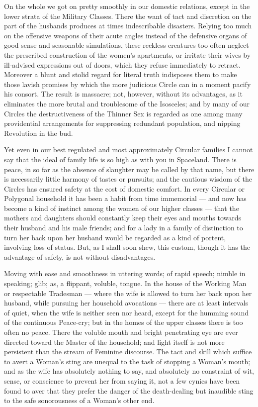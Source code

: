 \documentclass[12pt, a4paper, twoside]{memoir}
\begin{document}
On the whole we got on pretty smoothly in our domestic
relations, except in the lower strata of the Military Classes. There the want
of tact and discretion on the part of the husbands produces at times
indescribable disasters. Relying too much on the offensive weapons of their
acute angles instead of the defensive organs of good sense and seasonable
simulations, these reckless creatures too often neglect the prescribed
construction of the women's apartments, or irritate their wives by ill-advised
expressions out of doors, which they refuse immediately to retract. Moreover a
blunt and stolid regard for literal truth indisposes them to make those lavish
promises by which the more judicious Circle can in a moment pacify his
consort. The result is massacre; not, however, without its advantages, as it
eliminates the more brutal and troublesome of the Isosceles; and by many of
our Circles the destructiveness of the Thinner Sex is regarded as one among
many providential arrangements for suppressing redundant population, and
nipping Revolution in the bud.

Yet even in our best regulated and most approximately Circular families I
cannot say that the ideal of family life is so high as with you in Spaceland.
There is peace, in so far as the absence of slaughter may be called by that
name, but there is necessarily little harmony of tastes or pursuits; and the
cautious wisdom of the Circles has ensured safety at the cost of domestic
comfort. In every Circular or Polygonal household it has been a habit from
time immemorial --- and now has become a kind of instinct among the women of our
higher classes --- that the mothers and daughters should constantly keep their
eyes and mouths towards their husband and his male friends; and for a lady in
a family of distinction to turn her back upon her husband would be regarded as
a kind of portent, involving loss of status. But, as I shall soon shew, this
custom, though it has the advantage of safety, is not without disadvantages.

Moving with ease and smoothness in uttering words; of rapid speech;
nimble in speaking; glib; as, a flippant, voluble, tongue.  In the house of
the Working Man or respectable Tradesman --- where the wife is allowed to turn
her back upon her husband, while pursuing her household avocations --- there are
at least intervals of quiet, when the wife is neither seen nor heard, except
for the humming sound of the continuous Peace-cry; but in the homes of the
upper classes there is too often no peace. There the voluble mouth and bright
penetrating eye are ever directed toward the Master of the household; and
light itself is not more persistent than the stream of Feminine discourse. The
tact and skill which suffice to avert a Woman's sting are unequal to the task
of stopping a Woman's mouth; and as the wife has absolutely nothing to say,
and absolutely no constraint of wit, sense, or conscience to prevent her from
saying it, not a few cynics have been found to aver that they prefer the
danger of the death-dealing but inaudible sting to the safe sonorousness of a
Woman's other end.
\end{document}
